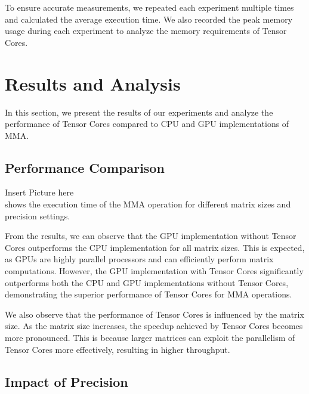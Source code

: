 \documentclass[conference]{IEEEtran}
\begin{document}
  To ensure accurate measurements, we repeated each experiment multiple times and calculated the average execution time. We also recorded the peak memory usage during each experiment to analyze the memory requirements of Tensor Cores.
  
  \section{Results and Analysis}\label{sec:results-analysis}
  
  In this section, we present the results of our experiments and analyze the performance of Tensor Cores compared to CPU and GPU implementations of MMA.
  
  \subsection{Performance Comparison}\label{sec:performance-comparison}

  Insert Picture here\\
  shows the execution time of the MMA operation for different matrix sizes and precision settings.
  
  \begin{figure}[htbp]
  \end{figure}
  
  From the results, we can observe that the GPU implementation without Tensor Cores outperforms the CPU implementation for all matrix sizes. This is expected, as GPUs are highly parallel processors and can efficiently perform matrix computations. However, the GPU implementation with Tensor Cores significantly outperforms both the CPU and GPU implementations without Tensor Cores, demonstrating the superior performance of Tensor Cores for MMA operations.
  
  We also observe that the performance of Tensor Cores is influenced by the matrix size. As the matrix size increases, the speedup achieved by Tensor Cores becomes more pronounced. This is because larger matrices can exploit the parallelism of Tensor Cores more effectively, resulting in higher throughput.
  
  \subsection{Impact of Precision}\label{sec:impact-precision}
  
\end{document}
